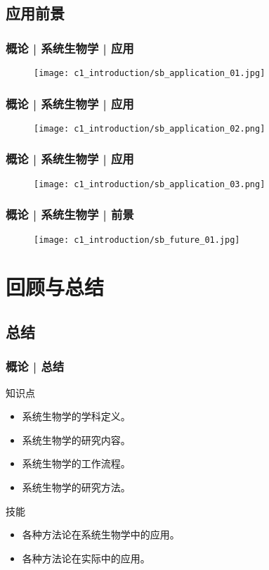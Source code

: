 \subsection{应用前景}
\begin{frame}
  \frametitle{概论 | 系统生物学 | 应用}
  \begin{figure}
    \centering
    \texttt{[image: c1\_introduction/sb\_application\_01.jpg]}
  \end{figure}
\end{frame}

\begin{frame}
  \frametitle{概论 | 系统生物学 | 应用}
  \begin{figure}
    \centering
    \texttt{[image: c1\_introduction/sb\_application\_02.png]}
  \end{figure}
\end{frame}

\begin{frame}
  \frametitle{概论 | 系统生物学 | 应用}
  \begin{figure}
    \centering
    \texttt{[image: c1\_introduction/sb\_application\_03.png]}
  \end{figure}
\end{frame}

\begin{frame}
  \frametitle{概论 | 系统生物学 | 前景}
  \begin{figure}
    \centering
    \texttt{[image: c1\_introduction/sb\_future\_01.jpg]}
  \end{figure}
\end{frame}



\section{回顾与总结}
\subsection{总结}
\begin{frame}
  \frametitle{概论 | 总结}
  \begin{block}{知识点}
    \begin{itemize}
      \item 系统生物学的学科定义。
      \item 系统生物学的研究内容。
      \item 系统生物学的工作流程。
      \item 系统生物学的研究方法。
    \end{itemize}
  \end{block}
  \begin{block}{技能}
    \begin{itemize}
      \item 各种方法论在系统生物学中的应用。
      \item 各种方法论在实际中的应用。
    \end{itemize}
  \end{block}
\end{frame}

